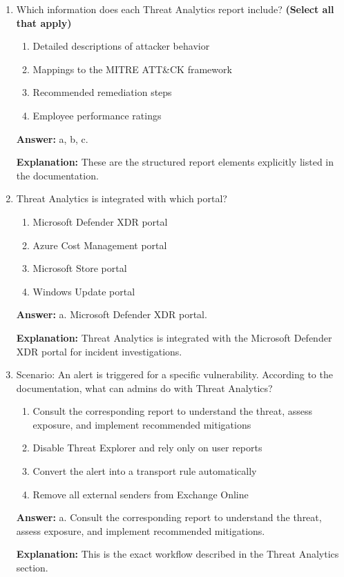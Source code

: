 \documentclass[10pt]{article}
\begin{document}
\begin{enumerate}[leftmargin=*]
\textbf{Explanation:} This is the exact description given in the documentation.

\item Which information does each Threat Analytics report include? \textbf{(Select all that apply)}
\begin{enumerate}[label=\alph*., leftmargin=1.5em]
\item Detailed descriptions of attacker behavior
\item Mappings to the MITRE ATT\&CK framework
\item Recommended remediation steps
\item Employee performance ratings
\end{enumerate}
\textbf{Answer:} a, b, c.

\textbf{Explanation:} These are the structured report elements explicitly listed in the documentation.

\item Threat Analytics is integrated with which portal?
\begin{enumerate}[label=\alph*., leftmargin=1.5em]
\item Microsoft Defender XDR portal
\item Azure Cost Management portal
\item Microsoft Store portal
\item Windows Update portal
\end{enumerate}
\textbf{Answer:} a. Microsoft Defender XDR portal.

\textbf{Explanation:} Threat Analytics is integrated with the Microsoft Defender XDR portal for incident investigations.

\item Scenario: An alert is triggered for a specific vulnerability. According to the documentation, what can admins do with Threat Analytics?
\begin{enumerate}[label=\alph*., leftmargin=1.5em]
\item Consult the corresponding report to understand the threat, assess exposure, and implement recommended mitigations
\item Disable Threat Explorer and rely only on user reports
\item Convert the alert into a transport rule automatically
\item Remove all external senders from Exchange Online
\end{enumerate}
\textbf{Answer:} a. Consult the corresponding report to understand the threat, assess exposure, and implement recommended mitigations.

\textbf{Explanation:} This is the exact workflow described in the Threat Analytics section.

\end{enumerate}
\clearpage
\end{document}

